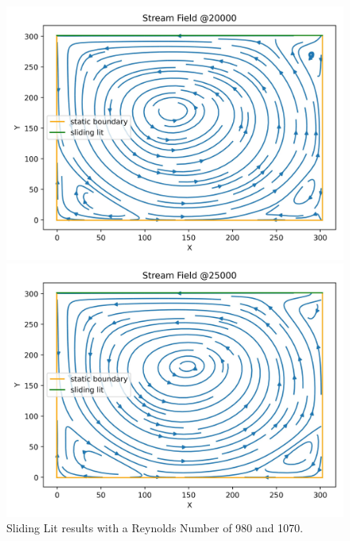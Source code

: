\begin{figure}[H]
    \begin{center}
        \begin{minipage}{0.5\textwidth}
            \includegraphics[width=\linewidth]{graphs/SlidingLit/stream_field_20000_rn}
        \end{minipage}%
        \begin{minipage}{0.5\textwidth}
            \includegraphics[width=\linewidth]{graphs/SlidingLit/stream_field_25000_rn}
        \end{minipage}        \caption{Sliding Lit results with a Reynolds Number of 980 and 1070.}
        \label{fig:sl-mlups}
    \end{center}
\end{figure}

